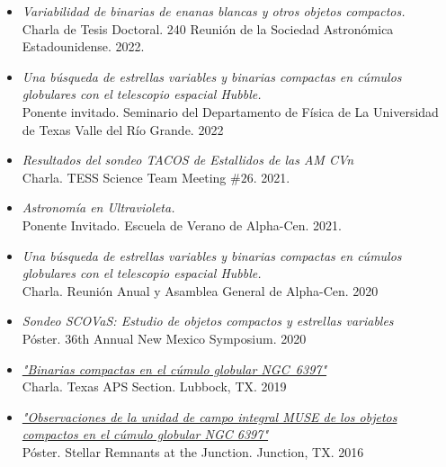 \documentclass[letterpaper,10pt]{article}
\begin{document}
\begin{itemize}[label=$\blacktriangleright$]
\item \textit{Variabilidad de binarias de enanas blancas y otros objetos compactos.} \\ Charla de Tesis Doctoral. 240 Reuni\'on de la Sociedad Astron\'omica Estadounidense. 2022.


\item \emph{Una b\'usqueda de estrellas variables y binarias compactas en c\'umulos globulares con el telescopio espacial Hubble.} \\Ponente invitado. Seminario del Departamento de F\'isica de La Universidad de Texas Valle del R\'io Grande. 2022


\item \textit{Resultados del sondeo TACOS de Estallidos de las AM CVn} \\ Charla. TESS Science Team Meeting $\#26$. 2021.


\item \textit{Astronom\'ia en Ultravioleta.} \\
Ponente Invitado. Escuela de Verano de Alpha-Cen. 2021.

\item \textit{Una b\'usqueda de estrellas variables y binarias compactas en c\'umulos globulares con el telescopio espacial Hubble.}\\ Charla. Reuni\'on Anual y Asamblea General de Alpha-Cen. 2020


\item \textit{Sondeo SCOVaS: Estudio de objetos compactos y estrellas variables}\\ P\'oster. 36th Annual New Mexico Symposium. 2020

\item \textit{\href{https://manuelpm.me/TexasAPS2019/}{"Binarias compactas en el c\'umulo globular NGC~6397"}} \\Charla. Texas APS Section. Lubbock, TX. 2019



\item \textit{\href{http://manuelpm.me/papers/MUSEP\'oster.pdf}{"Observaciones de la unidad de campo integral MUSE de los objetos compactos en el c\'umulo globular NGC 6397"}} \\P\'oster. Stellar Remnants at the Junction. Junction, TX. 2016





\end{itemize}
\end{document}
